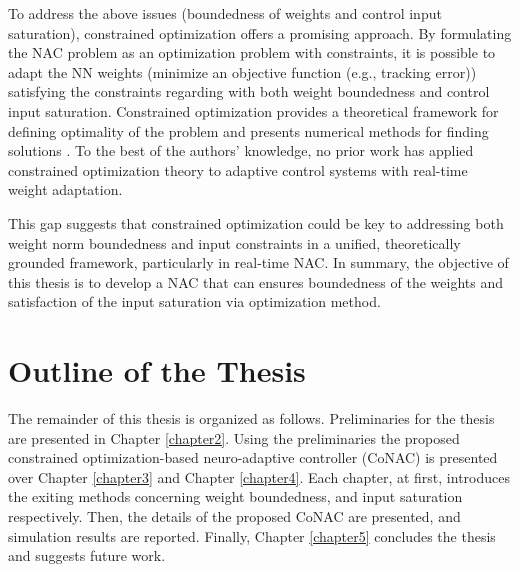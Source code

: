 To address the above issues (boundedness of weights and control input saturation), constrained optimization offers a promising approach. 
By formulating the NAC problem as an optimization problem with constraints, it is possible to adapt the NN weights (minimize an objective function (e.g., tracking error)) satisfying the constraints regarding with both weight boundedness and control input saturation. 
Constrained optimization provides a theoretical framework for defining optimality of the problem and presents numerical methods for finding solutions \cite{RN9}.
To the best of the authors’ knowledge, no prior work has applied constrained optimization theory to adaptive control systems with real-time weight adaptation.

This gap suggests that constrained optimization could be key to addressing both weight norm boundedness and input constraints in a unified, theoretically grounded framework, particularly in real-time NAC.
In summary, the objective of this thesis is to develop a NAC that can ensures boundedness of the weights and satisfaction of the input saturation via optimization method.

\section{Outline of the Thesis} 

The remainder of this thesis is organized as follows. 
Preliminaries for the thesis are presented in Chapter \ref{chapter2}.
Using the preliminaries the proposed constrained optimization-based neuro-adaptive controller (CoNAC) is presented over Chapter \ref{chapter3} and Chapter \ref{chapter4}.
Each chapter, at first, introduces the exiting methods concerning weight boundedness, and input saturation respectively.
Then, the details of the proposed CoNAC are presented, and simulation results are reported.
Finally, Chapter \ref{chapter5} concludes the thesis and suggests future work.
